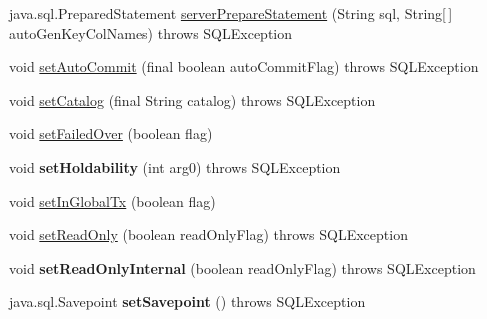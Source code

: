 \begin{DoxyCompactItemize}
\item 
java.\+sql.\+Prepared\+Statement \mbox{\hyperlink{classcom_1_1mysql_1_1cj_1_1jdbc_1_1_connection_impl_ae7caa7907c0b5245c5f8ac2f209abf2a}{server\+Prepare\+Statement}} (String sql, String\mbox{[}$\,$\mbox{]} auto\+Gen\+Key\+Col\+Names)  throws S\+Q\+L\+Exception 
\item 
void \mbox{\hyperlink{classcom_1_1mysql_1_1cj_1_1jdbc_1_1_connection_impl_a53c90790a0e3d5c1ebae0278a15453be}{set\+Auto\+Commit}} (final boolean auto\+Commit\+Flag)  throws S\+Q\+L\+Exception 
\item 
void \mbox{\hyperlink{classcom_1_1mysql_1_1cj_1_1jdbc_1_1_connection_impl_aa496cdf7782256493c7bddd156d9b75d}{set\+Catalog}} (final String catalog)  throws S\+Q\+L\+Exception 
\item 
void \mbox{\hyperlink{classcom_1_1mysql_1_1cj_1_1jdbc_1_1_connection_impl_afef2182754848487fb2e37daea9ff7eb}{set\+Failed\+Over}} (boolean flag)
\item 
\mbox{\label{classcom_1_1mysql_1_1cj_1_1jdbc_1_1_connection_impl_a8aa784925793e967a593b4c171a9f13b}} 
void {\bfseries set\+Holdability} (int arg0)  throws S\+Q\+L\+Exception 
\item 
void \mbox{\hyperlink{classcom_1_1mysql_1_1cj_1_1jdbc_1_1_connection_impl_a70a08ce7c0dea524a32a245986fb1531}{set\+In\+Global\+Tx}} (boolean flag)
\item 
void \mbox{\hyperlink{classcom_1_1mysql_1_1cj_1_1jdbc_1_1_connection_impl_a52d1622cdb325e2780cd5f224afc09e0}{set\+Read\+Only}} (boolean read\+Only\+Flag)  throws S\+Q\+L\+Exception 
\item 
\mbox{\label{classcom_1_1mysql_1_1cj_1_1jdbc_1_1_connection_impl_a1926df8f86ddb350d61ce032e248a1ba}} 
void {\bfseries set\+Read\+Only\+Internal} (boolean read\+Only\+Flag)  throws S\+Q\+L\+Exception 
\item 
\mbox{\label{classcom_1_1mysql_1_1cj_1_1jdbc_1_1_connection_impl_af555ecffd63824b2d0ffd566f6aab7cc}} 
java.\+sql.\+Savepoint {\bfseries set\+Savepoint} ()  throws S\+Q\+L\+Exception 
\item 
\mbox{\label{classcom_1_1mysql_1_1cj_1_1jdbc_1_1_connection_impl_ad50f77c6baf0a478c35d52ba98e76e84}} 

\end{DoxyCompactItemize}
